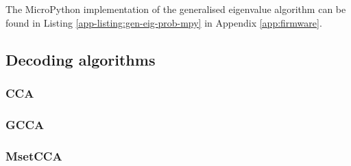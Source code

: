 The MicroPython implementation of the generalised eigenvalue algorithm can be found in Listing \ref{app-listing:gen-eig-prob-mpy} in Appendix \ref{app:firmware}.

\subsection{Decoding algorithms}
\subsubsection{CCA}
\subsubsection{GCCA}
\subsubsection{MsetCCA}



